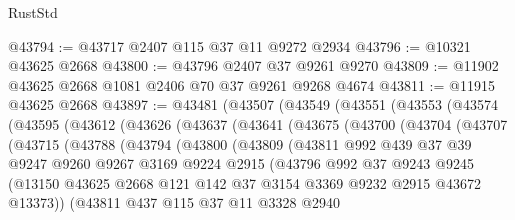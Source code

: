 \begin{lexlean}{RustStd}
\begin{coremodule}
@43794 := @43717 @2407 @115 @37 @11 @9272 @2934
@43796 := @10321 @43625 @2668
@43800 := @43796 @2407 @37 @9261 @9270
@43809 := @11902 @43625 @2668 @1081 @2406 @70 @37 @9261 @9268 @4674
@43811 := @11915 @43625 @2668
@43897 := @43481
    (@43507
      (@43549
        (@43551
          (@43553
            (@43574
              (@43595
                (@43612
                  (@43626
                    (@43637
                      (@43641
                        (@43675
                          (@43700
                            (@43704
                              (@43707
                                (@43715
                                  (@43788
                                    (@43794
                                      (@43800
                                        (@43809
                                          (@43811
                                            @992
                                            @439
                                            @37
                                            @39
                                            @9247
                                            @9260
                                            @9267
                                            @3169
                                            @9224
                                            @2915
                                            (@43796
                                              @992
                                              @37
                                              @9243
                                              @9245
                                              (@13150
                                                @43625
                                                @2668
                                                @121
                                                @142
                                                @37
                                                @3154
                                                @3369
                                                @9232
                                                @2915
                                                @43672
                                                @13373))
                                            (@43811
                                              @437
                                              @115
                                              @37
                                              @11
                                              @3328
                                              @2940

\end{coremodule}
\end{lexlean}
